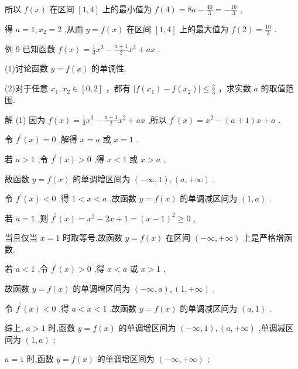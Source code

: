 \documentclass[10pt]{article}
\begin{document}
所以 \(f\left( x\right)\) 在区间 \(\left\lbrack  {1,4}\right\rbrack\) 上的最小值为 \(f\left( 4\right)  = {8a} - \frac{40}{3} =  - \frac{16}{3}\) ,

得 \(a = 1,{x}_{2} = 2\) ,从而 \(y = f\left( x\right)\) 在区间 \(\left\lbrack  {1,4}\right\rbrack\) 上的最大值为 \(f\left( 2\right)  = \frac{10}{3}\) .

例 9 已知函数 \(f\left( x\right)  = \frac{1}{3}{x}^{3} - \frac{a + 1}{2}{x}^{2} + {ax}\) .

(1)讨论函数 \(y = f\left( x\right)\) 的单调性.

(2)对于任意 \({x}_{1},{x}_{2} \in  \left\lbrack  {0,2}\right\rbrack\) ，都有 \(\left| {f\left( {x}_{1}\right)  - f\left( {x}_{2}\right) }\right|  \leq  \frac{2}{3}\) ，求实数 \(a\) 的取值范围.

解 (1) 因为 \(f\left( x\right)  = \frac{1}{3}{x}^{3} - \frac{a + 1}{2}{x}^{2} + {ax}\) ,所以 \({f}^{\prime }\left( x\right)  = {x}^{2} - \left( {a + 1}\right) x + a\) .

令 \({f}^{\prime }\left( x\right)  = 0\) ,解得 \(x = a\) 或 \(x = 1\) .

若 \(a > 1\) ,令 \({f}^{\prime }\left( x\right)  > 0\) ,得 \(x < 1\) 或 \(x > a\) ,

故函数 \(y = f\left( x\right)\) 的单调增区间为 \(\left( {-\infty ,1}\right) ,\left( {a, + \infty }\right)\) .

令 \({f}^{\prime }\left( x\right)  < 0\) ,得 \(1 < x < a\) ,故函数 \(y = f\left( x\right)\) 的单调减区间为 \(\left( {1,a}\right)\) .

若 \(a = 1\) ,则 \({f}^{\prime }\left( x\right)  = {x}^{2} - {2x} + 1 = {\left( x - 1\right) }^{2} \geq  0\) ,

当且仅当 \(x = 1\) 时取等号,故函数 \(y = f\left( x\right)\) 在区间 \(\left( {-\infty , + \infty }\right)\) 上是严格增函数.

若 \(a < 1\) ,令 \({f}^{\prime }\left( x\right)  > 0\) ,得 \(x < a\) 或 \(x > 1\) ,

故函数 \(y = f\left( x\right)\) 的单调增区间为 \(\left( {-\infty ,a}\right) ,\left( {1, + \infty }\right)\) .

令 \({f}^{\prime }\left( x\right)  < 0\) ,得 \(a < x < 1\) ,故函数 \(y = f\left( x\right)\) 的单调减区间为 \(\left( {a,1}\right)\) .

综上, \(a > 1\) 时,函数 \(y = f\left( x\right)\) 的单调增区间为 \(\left( {-\infty ,1}\right) ,\left( {a, + \infty }\right)\) ,单调减区间为 \(\left( {1,a}\right)\) ;

\(a = 1\) 时,函数 \(y = f\left( x\right)\) 的单调增区间为 \(\left( {-\infty , + \infty }\right)\) ;
\end{document}
